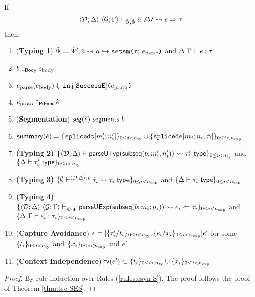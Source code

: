 \begin{theorem}
\label{thm:tsc-implicit-B}
If \[\langle \mathcal{D}; \Delta \rangle~\langle \mathcal{G}; \Gamma \rangle \vdash_{\hat{\Psi}; \hat\Phi} \hat{a}~\texttt{/}b\texttt{/} \leadsto e \Rightarrow \tau\] then:
\begin{enumerate}
\item (\textbf{Typing 1}) $\hat{\Psi} = \hat{\Psi}', \hat{a} \leadsto a \hookrightarrow \texttt{setsm}\texttt{(}\tau;\,e_\text{parse}\texttt{)}$ and $\Delta~\Gamma \vdash e : \tau$
\item $b \downarrow_\mathsf{Body} e_\text{body}$
\item $e_\text{parse}(e_\text{body}) \Downarrow \texttt{inj}[\mathtt{SuccessE}]\texttt{(}e_\text{proto}\texttt{)}$
\item $e_\text{proto} \uparrow_\mathsf{PrExpr} \grave{e}$
\item (\textbf{Segmentation}) $\mathsf{seg}(\grave{e})~\mathsf{segments}~b$
\item $\mathsf{summary}(\grave{e}) = \{\texttt{splicedt}[m'_i; n'_i]\}_{0 \leq i < n_\text{ty}} \cup \{\texttt{splicede}[m_i; n_i; \grave{\tau}_i]\}_{0 \leq i < n_\text{exp}}$
\item \textbf{(Typing 2)} $\{
      \langle \mathcal{D}; \Delta \rangle \vdash 
        \mathsf{parseUTyp}(\mathsf{subseq}(b; m'_i; n'_i))
       \leadsto \tau'_i~\mathsf{type}
    \}_{0 \leq i < n_\text{ty}}$ and $\{\Delta \vdash \tau'_i~\mathsf{type}\}_{0 \leq i < n_\text{ty}}$
\item \textbf{(Typing 3)} $\{
  \emptyset\vdash^{
    \langle \mathcal{D}; \Delta \rangle
      ;\,b
  } 
    \grave{\tau}_i
   \leadsto \tau_i~\mathsf{type}
\}_{0 \leq i < n_\text{exp}}$ and $\{\Delta \vdash \tau_i~\mathsf{type}\}_{0 \leq i < n_\text{exp}}$
\item \textbf{(Typing 4)} $\{
  \langle \mathcal{D}; \Delta \rangle~\langle \mathcal{G}; \Gamma \rangle \vdash_{\hat{\Psi}; \hat\Phi} \mathsf{parseUExp}(\mathsf{subseq}(b; m_i; n_i)) \leadsto e_i \Leftarrow \tau_i
\}_{0 \leq i < n_\text{exp}}$ and $\{\Delta~\Gamma \vdash e_i : \tau_i\}_{0 \leq i < n_\text{exp}}$
\item (\textbf{Capture Avoidance}) $e = [\{\tau'_i/t_i\}_{0 \leq i < n_\text{ty}}, \{e_i/x_i\}_{0 \leq i < n_\text{exp}}]e'$ for some $\{t_i\}_{0 \leq i < n_\text{ty}}$ and $\{x_i\}_{0 \leq i < n_\text{exp}}$ and $e'$
\item (\textbf{Context Independence}) $\mathsf{fv}(e') \subset \{t_i\}_{0 \leq i < n_\text{ty}} \cup \{x_i\}_{0 \leq i < n_\text{exp}}$
\end{enumerate}
\end{theorem}
\begin{proof} By rule induction over Rules (\ref{rules:esyn-S}). The proof follows the proof of Theorem \ref{thm:tsc-SES}.
\end{proof}


